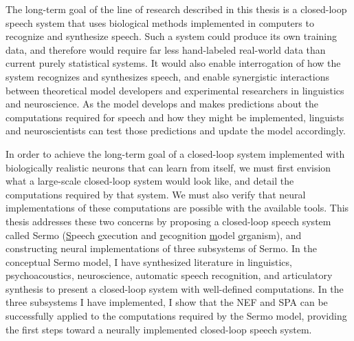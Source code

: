 The long-term goal of the line of research
described in this thesis
is a closed-loop speech system
that uses biological methods
implemented in computers
to recognize and synthesize speech.
Such a system could produce its own training data,
and therefore would require
far less hand-labeled real-world data than
current purely statistical systems.
It would also enable interrogation
of how the system recognizes
and synthesizes speech,
and enable synergistic interactions
between theoretical model developers
and experimental researchers
in linguistics and neuroscience.
As the model develops and makes predictions
about the computations required for speech
and how they might be implemented,
linguists and neuroscientists
can test those predictions
and update the model accordingly.

In order to achieve the long-term goal
of a closed-loop system
implemented with biologically realistic neurons
that can learn from itself,
we must first
envision what a large-scale closed-loop system
would look like,
and detail the computations required by that system.
We must also verify that neural implementations
of these computations
are possible with the available tools.
This thesis addresses these two concerns
by proposing a closed-loop speech system
called Sermo
(\underline{S}peech \underline{e}xecution and
\underline{r}ecognition \underline{m}odel \underline{o}rganism),
and constructing neural implementations
of three subsystems of Sermo.
In the conceptual Sermo model,
I have synthesized literature
in linguistics, psychoacoustics, neuroscience,
automatic speech recognition,
and articulatory synthesis
to present a closed-loop system
with well-defined computations.
In the three subsystems I have implemented,
I show that the NEF and SPA
can be successfully applied to
the computations required by the Sermo model,
providing the first steps
toward a neurally implemented closed-loop speech system.

